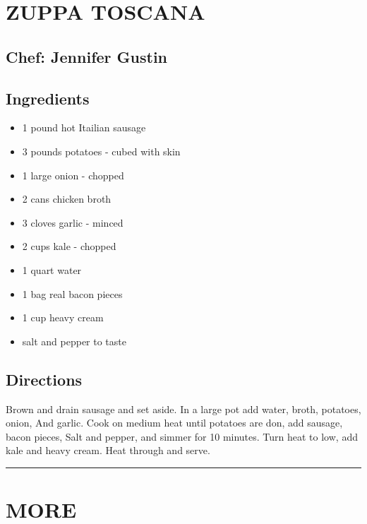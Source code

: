 \documentclass[
]{book}
\providecommand{\tightlist}{%
  \setlength{\itemsep}{0pt}\setlength{\parskip}{0pt}}
\begin{document}
\hypertarget{zuppa-toscana}{%
\section*{ZUPPA TOSCANA}\label{zuppa-toscana}}


\hypertarget{chef-jennifer-gustin-6}{%
\subsection*{Chef: Jennifer Gustin}\label{chef-jennifer-gustin-6}}


\hypertarget{ingredients-24}{%
\subsection*{Ingredients}\label{ingredients-24}}


\begin{itemize}
\tightlist
\item
  1 pound hot Itailian sausage
\item
  3 pounds potatoes - cubed with skin
\item
  1 large onion - chopped
\item
  2 cans chicken broth
\item
  3 cloves garlic - minced
\item
  2 cups kale - chopped
\item
  1 quart water
\item
  1 bag real bacon pieces
\item
  1 cup heavy cream
\item
  salt and pepper to taste
\end{itemize}

\hypertarget{directions-24}{%
\subsection*{Directions}\label{directions-24}}


Brown and drain sausage and set aside. In a large pot add water, broth, potatoes, onion,
And garlic. Cook on medium heat until potatoes are don, add sausage, bacon pieces,
Salt and pepper, and simmer for 10 minutes. Turn heat to low, add kale and heavy cream.
Heat through and serve.

\begin{center}\rule{0.5\linewidth}{0.5pt}\end{center}

\hypertarget{more}{%
\section*{MORE}\label{more}}
\end{document}
